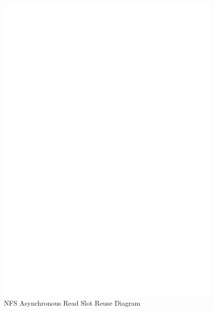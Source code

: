 \begin{figure}
\centering
\includegraphics[scale=0.7]{figures/Slotreuse.eps}
\caption{NFS Asynchronous Read Slot Reuse Diagram}
\label{fig:NFSSlotreuse}
\end{figure}

